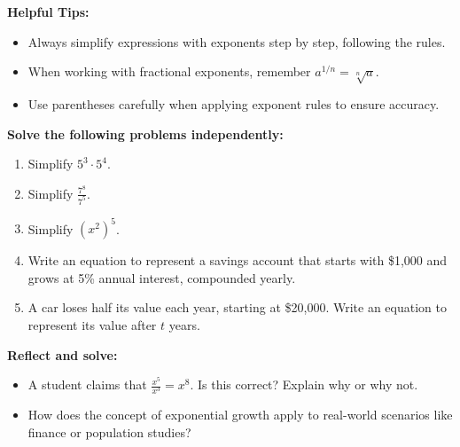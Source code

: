 \documentclass[12pt]{article}
\begin{document}
\vspace{1em}

\begin{tcolorbox}[colframe=black!40, colback=gray!5, 
coltitle=black, colbacktitle=black!20, fonttitle=\bfseries\Large, 
title=Additional Notes, halign title=center, left=5pt, right=5pt, top=5pt, bottom=15pt]
\textbf{Helpful Tips:}
\begin{itemize}
    \item Always simplify expressions with exponents step by step, following the rules.
    \item When working with fractional exponents, remember \( a^{1/n} = \sqrt[n]{a} \).
    \item Use parentheses carefully when applying exponent rules to ensure accuracy.
\end{itemize}
\end{tcolorbox}

\vspace{1em}

\begin{tcolorbox}[colframe=black!60, colback=white, 
coltitle=black, colbacktitle=black!15, fonttitle=\bfseries\Large, 
title=Independent Practice, halign title=center, left=10pt, right=10pt, top=10pt, bottom=15pt]
\textbf{Solve the following problems independently:}
\begin{enumerate}[itemsep=5em]
    \item Simplify \( 5^3 \cdot 5^4 \).
    \item Simplify \( \frac{7^8}{7^5} \).
    \item Simplify \( (x^2)^5 \).
    \item Write an equation to represent a savings account that starts with \$1,000 and grows at 5\% annual interest, compounded yearly.
    \item A car loses half its value each year, starting at \$20,000. Write an equation to represent its value after \(t\) years.
\end{enumerate}
\end{tcolorbox}

\vspace{1em}

\begin{tcolorbox}[colframe=black!60, colback=white, 
coltitle=black, colbacktitle=black!15, fonttitle=\bfseries\Large, 
title=Exit Ticket, halign title=center, left=10pt, right=10pt, top=10pt, bottom=15pt]
\textbf{Reflect and solve:}
\begin{itemize}
    \item A student claims that \( \frac{x^5}{x^3} = x^8 \). Is this correct? Explain why or why not.
    \item How does the concept of exponential growth apply to real-world scenarios like finance or population studies?
\end{itemize}
\end{tcolorbox}
\end{document}
